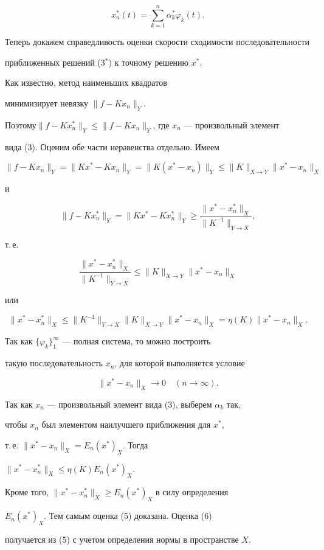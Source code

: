 \begin{pf}
\begin{equation}
x_n^*(t)=\sum_{k=1}^n \alpha_k^* \varphi_k(t). \tag{$3^\ast$}


\end{equation}


Теперь докажем справедливость оценки скорости сходимости последовательности 


приближенных решений (3${}^*$) к точному решению $x^*$. 





Как известно, метод наименьших квадратов 


минимизирует невязку $\|f-Kx_n\|_Y$. 


Поэтому\linebreak $\|f-Kx_n^*\|_Y\leq \|f-Kx_n\|_Y$, где $x_n$ --- произвольный элемент 


вида (3). Оценим обе части неравенства отдельно. Имеем


$$


\|f-Kx_n\|_Y=\|Kx^*-Kx_n\|_Y=\|K(x^*-x_n)\|_Y \leq \|K\|_{X \to Y}\|x^*-x_n\|_X


$$


и 


$$


\|f-Kx_n^*\|_Y=\|Kx^*-Kx_n^*\|_Y \geq \frac{\|x^*-x^*_n\|_X}{\|K^{-1}\|_{Y\to X}},


$$


т.\,е.


$$


\frac{\|x^*-x^*_n\|_X}{\|K^{-1}\|_{Y\to X}}\leq \|K\|_{X \to Y}\|x^*-x_n\|_X


$$


или 


$$


\|x^*-x^*_n\|_X\leq \|K^{-1}\|_{Y\to X}\|K\|_{X \to Y}\|x^*-x_n\|_X=


\eta(K)\|x^*-x_n\|_X.


$$


Так как $\{\varphi_{k}\}_{1}^{\infty}$ --- полная система, то можно построить


такую последовательность $x_n$, для которой выполняется условие 


$$


\|x^*-x_n\|_X \to 0 \quad (n \to \infty ).


$$ 


Так как $x_n$ --- произвольный элемент вида (3), выберем $\alpha_k$ так, 


чтобы $x_n$ был элементом наилучшего приближения для $x^*$, 


т.\,е. $\|x^*-x_n\|_{X}=E_n(x^{*})_{X}$. Тогда


$\|x^*-x_n^*\|_X\le\eta(K)E_n(x^*)_X$.


Кроме того, $\|x^*-x_n^*\|_{X} \geq E_n(x^{*})_{X}$ в силу определения 


$E_n(x^{*})_X$. Тем самым оценка (5) доказана. Оценка (6) 


получается из (5) с учетом определения нормы в пространстве $X$.


\end{pf}








